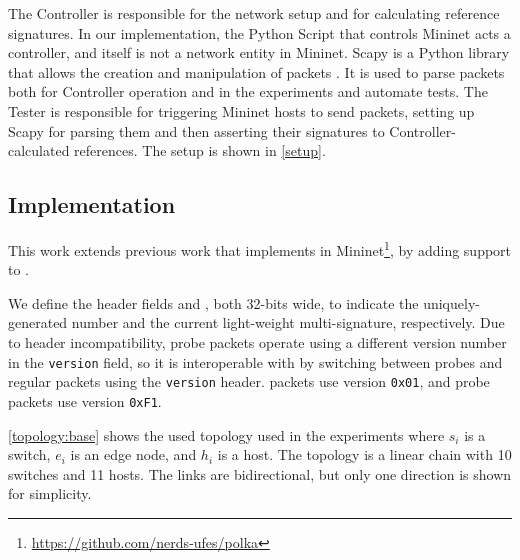 The Controller is responsible for the network setup and for calculating reference signatures.
In our implementation, the Python Script that controls Mininet acts a controller, and itself is not a network entity in Mininet.
Scapy is a Python library that allows the creation and manipulation of packets \cite{scapy}. It is used to parse packets both for Controller operation and in the experiments and automate tests.
The Tester is responsible for triggering Mininet hosts to send packets, setting up Scapy for parsing them and then asserting their signatures to Controller-calculated references.
The setup is shown in \autoref{setup}. 


\subsection{Implementation}

This work extends previous work that implements \polka in Mininet\cite{polkap4}\footnote{\url{https://github.com/nerds-ufes/polka}}, by adding support to \pathsec.

We define the header fields \timestamp and \lhash, both 32-bits wide, to indicate the uniquely-generated number and the current light-weight multi-signature, respectively. Due to header incompatibility, probe packets operate using a different version number in the \texttt{version} field, so it is interoperable with \polka by switching between probes and regular packets using the \texttt{version} header. \polka packets use version \texttt{0x01}, and probe packets use version \texttt{0xF1}. 

\autoref{topology:base} shows the used topology used in the experiments where $s_i$ is a switch, $e_i$ is an edge node, and $h_i$ is a host. The topology is a linear chain with 10 switches and 11 hosts. The links are bidirectional, but only one direction is shown for simplicity. %

